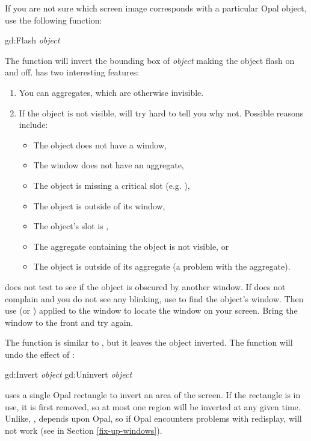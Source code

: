 If you are not sure which screen image corresponds with a
particular Opal object, use the following function:
\begin{programexample}
gd:Flash {\it object}\value{function}
\end{programexample}
The  function will invert the bounding box of {\it object}
making the object flash on and off.   has two interesting
features:
\begin{enumerate}
\item You can  aggregates, which are otherwise invisible.

\item If the object is not visible,  will try hard to
tell you why not.  Possible reasons include:
\begin{itemize}
\item The object does not have a window,

\item The window does not have an aggregate,

\item The object is missing a critical slot (e.g. ),

\item The object is outside of its window,

\item The object's  slot is ,

\item The aggregate containing the object is not visible, or

\item The object is outside of its aggregate (a problem with the
aggregate).
\end{itemize}
\end{enumerate}
 does not test to see if the object is obscured by
another window.  If  does not complain and you
do not see any blinking, use  to find the object's
window.  Then use  (or ) applied to the window
to locate the window on your screen.  Bring the window to the front
and try again.

The  function is similar to , but it leaves
the object inverted.  The  function will undo the
effect of :
\begin{programexample}
gd:Invert {\it object}\value{function}
gd:Uninvert {\it object}\value{function}
\end{programexample}
 uses a single Opal rectangle to
invert an area of the screen.  If the rectangle is in use, it
is first removed, so at most one region will be inverted at any
given time.  Unlike, ,  depends upon Opal,
so if Opal encounters problems with redisplay,  will
not work (see  in Section \ref{fix-up-windows}).

